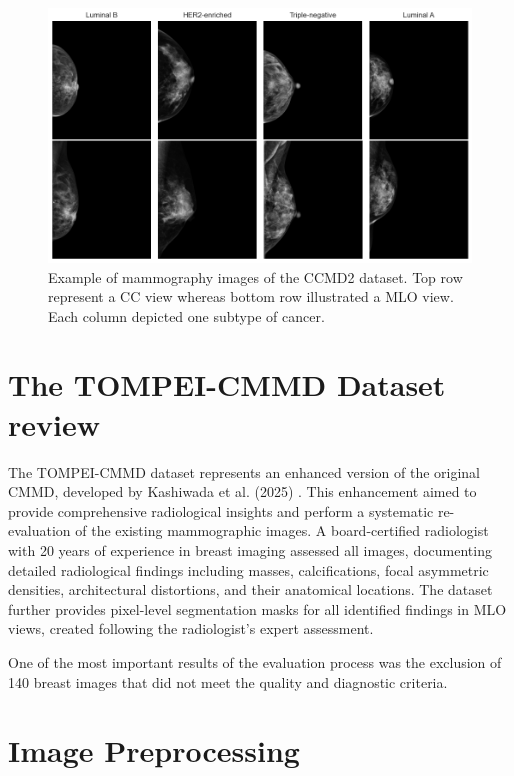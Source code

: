 \documentclass[a4paper,10pt]{book}
\begin{document}
\begin{figure}[h!]
	\centering
	\includegraphics[width=1\linewidth]{reports//assets/images_examples.png}
	\caption[CMMD2 mammography images examples]{Example of mammography images of the CCMD2 dataset. Top row represent a CC view whereas bottom row illustrated a MLO view. Each column depicted one subtype of cancer.}
	\label{fig:cmmd-examples}
\end{figure}

\newpage
\section{The TOMPEI-CMMD Dataset review}

The TOMPEI-CMMD dataset represents an enhanced version of the original CMMD, developed by Kashiwada et al. (2025) \cite{kashiwada_tompei-cmmd_2025}. This enhancement aimed to provide comprehensive radiological insights and perform a systematic re-evaluation of the existing mammographic images. A board-certified radiologist with 20 years of experience in breast imaging assessed all images, documenting detailed radiological findings including masses, calcifications, focal asymmetric densities, architectural distortions, and their anatomical locations. The dataset further provides pixel-level segmentation masks for all identified findings in MLO views, created following the radiologist's expert assessment. 

One of the most important results of the evaluation process was the exclusion of 140 breast images that did not meet the quality and diagnostic criteria. 

\section{Image Preprocessing}
\end{document}
